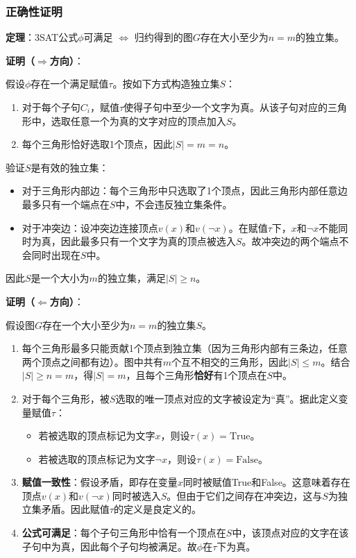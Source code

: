 \documentclass{sysucseexp}
\begin{document}
\subsubsection{正确性证明}

\textbf{定理}：3SAT公式$\phi$可满足 $\Leftrightarrow$ 归约得到的图$G$存在大小至少为$n = m$的独立集。

\textbf{证明（$\Rightarrow$方向）}：

假设$\phi$存在一个满足赋值$\tau$。按如下方式构造独立集$S$：
\begin{enumerate}
    \item 对于每个子句$C_i$，赋值$\tau$使得子句中至少一个文字为真。从该子句对应的三角形中，选取任意一个为真的文字对应的顶点加入$S$。
    \item 每个三角形恰好选取1个顶点，因此$|S| = m = n$。
\end{enumerate}

验证$S$是有效的独立集：
\begin{itemize}
    \item 对于三角形内部边：每个三角形中只选取了1个顶点，因此三角形内部任意边最多只有一个端点在$S$中，不会违反独立集条件。
    \item 对于冲突边：设冲突边连接顶点$v(x)$和$v(\neg x)$。在赋值$\tau$下，$x$和$\neg x$不能同时为真，因此最多只有一个文字为真的顶点被选入$S$。故冲突边的两个端点不会同时出现在$S$中。
\end{itemize}
因此$S$是一个大小为$m$的独立集，满足$|S| \geq n$。

\textbf{证明（$\Leftarrow$方向）}：

假设图$G$存在一个大小至少为$n = m$的独立集$S$。

\begin{enumerate}
    \item 每个三角形最多只能贡献1个顶点到独立集（因为三角形内部有三条边，任意两个顶点之间都有边）。图中共有$m$个互不相交的三角形，因此$|S| \leq m$。结合$|S| \geq n = m$，得$|S| = m$，且每个三角形\textbf{恰好}有1个顶点在$S$中。
    \item 对于每个三角形，被$S$选取的唯一顶点对应的文字被设定为``真''。据此定义变量赋值$\tau$：
    \begin{itemize}
        \item 若被选取的顶点标记为文字$x$，则设$\tau(x) = \text{True}$。
        \item 若被选取的顶点标记为文字$\neg x$，则设$\tau(x) = \text{False}$。
    \end{itemize}
    \item \textbf{赋值一致性}：假设矛盾，即存在变量$x$同时被赋值True和False。这意味着存在顶点$v(x)$和$v(\neg x)$同时被选入$S$。但由于它们之间存在冲突边，这与$S$为独立集矛盾。因此赋值$\tau$的定义是良定义的。
    \item \textbf{公式可满足}：每个子句三角形中恰有一个顶点在$S$中，该顶点对应的文字在该子句中为真，因此每个子句均被满足。故$\phi$在$\tau$下为真。
\end{enumerate}
\end{document}
